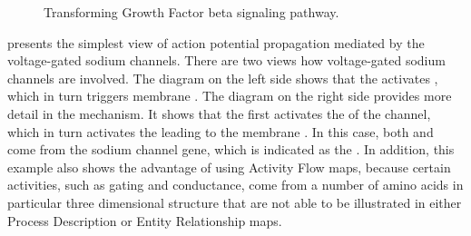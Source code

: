 \begin{figure}
\begin{center}
\caption{Transforming Growth Factor beta signaling pathway.}\label{fig:TGFbeta}
\end{center}
\end{figure}

 presents the simplest view of action potential propagation mediated by the voltage-gated sodium channels.  There are two views how voltage-gated sodium channels are involved.  The diagram on the left side shows that the  activates , which in turn triggers membrane .  The diagram on the right side provides more detail in the mechanism.  It shows that the  first activates the  of the channel, which in turn activates the  leading to the membrane .  In this case, both  and  come from the sodium channel gene, which is indicated as the .  In addition, this example also shows the advantage of using Activity Flow maps, because certain activities, such as gating and conductance, come from a number of amino acids in particular three dimensional structure that are not able to be illustrated in either Process Description or Entity Relationship maps.



